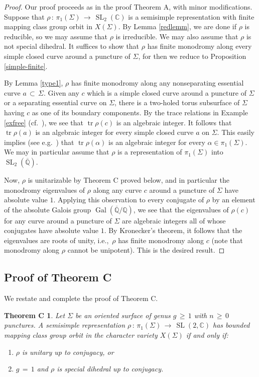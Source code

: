 \documentclass[reqno]{amsart}
\theoremstyle{plain}
\newtheorem*{theoremc}{Theorem C}
\theoremstyle{definition}
\theoremstyle{remark}
\newcommand{\C}{{\mathbb{C}}}
\newcommand{\Q}{{\mathbb{Q}}}
\DeclareMathOperator{\Gal}{Gal}
\DeclareMathOperator{\SL}{SL}
\DeclareMathOperator{\tr}{tr}
\newcommand{\slc}{{\SL (2,\mathbb{C})}}
\begin{document}
\begin{proof}
Our proof proceeds as in the proof Theorem A, with minor modifications. Suppose that $\rho\,:\, 
\pi_1(\Sigma)\,\to\,\SL_2(\C)$ is a semisimple representation with finite mapping class group orbit in $X(\Sigma)$. 
By Lemma \ref{redlemm}, we are done if $\rho$ is reducible, so we may assume that $\rho$ is irreducible. We may 
also assume that $\rho$ is not special dihedral. It suffices to show that $\rho$ has finite monodromy along 
every simple closed curve around a puncture of $\Sigma$, for then we reduce to Proposition \ref{simple-finite}.

By Lemma \ref{type1}, $\rho$ has finite monodromy along any nonseparating essential curve $a\,\subset\,\Sigma$. 
Given any $c$ which is a simple closed curve around a puncture of $\Sigma$ or a separating essential curve on $\Sigma$, there is a two-holed torus subsurface of 
$\Sigma$ having $c$ as one of its boundary components. By the trace relations in Example \ref{exfree} 
(cf.~\cite[Section 5.3]{goldman2}), we see that $\tr\rho(c)$ is an algebraic integer. It follows that $\tr\rho(a)$ is an algebraic integer for every simple closed curve $a$ on $\Sigma$. This easily implies (see e.g.~\cite[Section 2.1]{psw}) that $\tr\rho(\alpha)$ is an algebraic integer for every $\alpha\in\pi_1(\Sigma)$. We may in particular 
assume that $\rho$ is a representation of $\pi_1(\Sigma)$ into $\SL_2( \overline{\Q})$.

Now, $\rho$ is unitarizable by Theorem C proved below, and in particular the monodromy eigenvalues of $\rho$ 
along any curve $c$ around a puncture of $\Sigma$ have absolute value $1$. Applying this observation to every 
conjugate of $\rho$ by an element of the absolute Galois group $\Gal(\overline{\Q}/\Q)$, we see that the 
eigenvalues of $\rho(c)$ for any curve around a puncture of $\Sigma$ are algebraic integers all of whose 
conjugates have absolute value $1$. By Kronecker's theorem, it follows that the eigenvalues are roots of unity, 
i.e.,~$\rho$ has finite monodromy along $c$ (note that monodromy along $\rho$ cannot be unipotent). This is the 
desired result.
\end{proof}

\subsection{Proof of Theorem C}\label{sec:5.5}
We restate and complete the proof of Theorem C.

\begin{theoremc}
Let $\Sigma$ be an oriented surface of genus $g\,\geq\,1$ with $n\,\geq\,0$ punctures. A semisimple representation
$\rho\,:\,\pi_1(\Sigma)\,\to\,\slc$ has bounded mapping class group orbit in the character variety $X(\Sigma)$ if
and only if:
\begin{enumerate}
\item $\rho$ is unitary up to conjugacy, or

\item $g\,=\,1$ and $\rho$ is special dihedral up to conjugacy.
\end{enumerate} 
\end{theoremc}
\end{document}
